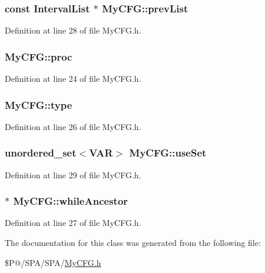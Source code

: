 \hypertarget{class_my_c_f_g_ad756fcb5363267f777c1067942d14979}{
\subsubsection[{prev\-List}]{\setlength{\rightskip}{0pt plus 5cm}const {\bf Interval\-List} $\ast$ My\-C\-F\-G\-::prev\-List}}\label{class_my_c_f_g_ad756fcb5363267f777c1067942d14979}


Definition at line 28 of file My\-C\-F\-G.\-h.

\hypertarget{class_my_c_f_g_a4c0a0b3dfef0a445bd0b888a91996e24}{
\subsubsection[{proc}]{ My\-C\-F\-G\-::proc}}\label{class_my_c_f_g_a4c0a0b3dfef0a445bd0b888a91996e24}


Definition at line 24 of file My\-C\-F\-G.\-h.

\hypertarget{class_my_c_f_g_ab85a034b6a5e716bd741bbed12bbce24}{
\subsubsection[{type}]{ My\-C\-F\-G\-::type}}\label{class_my_c_f_g_ab85a034b6a5e716bd741bbed12bbce24}


Definition at line 26 of file My\-C\-F\-G.\-h.

\hypertarget{class_my_c_f_g_a495c1e8a832860ee5bd2cb10ed9042e7}{
\subsubsection[{use\-Set}]{\setlength{\rightskip}{0pt plus 5cm}unordered\-\_\-set$<${\bf V\-A\-R}$>$ My\-C\-F\-G\-::use\-Set}}\label{class_my_c_f_g_a495c1e8a832860ee5bd2cb10ed9042e7}


Definition at line 29 of file My\-C\-F\-G.\-h.

\hypertarget{class_my_c_f_g_ac3b206e2ce40df67fd33f4fea05dc6d8}{
\subsubsection[{while\-Ancestor}]{$\ast$ My\-C\-F\-G\-::while\-Ancestor}}\label{class_my_c_f_g_ac3b206e2ce40df67fd33f4fea05dc6d8}


Definition at line 27 of file My\-C\-F\-G.\-h.



The documentation for this class was generated from the following file\-:\begin{DoxyCompactItemize}
\item 
\$\-P@/\-S\-P\-A/\-S\-P\-A/\hyperlink{_my_c_f_g_8h}{My\-C\-F\-G.\-h}\end{DoxyCompactItemize}
